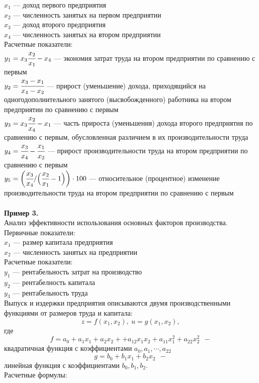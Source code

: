 \documentclass[12pt]{article}
\theoremstyle{definition}
\numberwithin{equation}{section}
\begin{document}
	$x_1$ --- доход первого предприятия\\
	$x_2$ --- численность занятых на первом предприятии\\
	$x_3$ --- доход второго предприятия\\
	$x_4$ --- численность занятых на втором предприятии\\
	Расчетные показатели:\\
	$y_1=x_3\cfrac{x_2}{x_1}-x_4$ --- экономия затрат труда на втором предприятии по сравнению с первым\\
	$y_2=\cfrac{x_3-x_1}{x_4-x_2}$ --- прирост (уменьшение) дохода, приходящийся на одногодополнительного занятого (высвобожденного) работника на втором предприятии по сравнению с первым\\
	$y_3=x_3\cfrac{x_2}{x_4}-x_1$ --- часть прироста (уменьшения) дохода второго предприятия по сравнению с первым, обусловленная различием в их производительности труда\\
	$y_4=\cfrac{x_3}{x_4}-\cfrac{x_1}{x_2}$ --- прирост производительности труда на втором предприятии по сравнению с первым\\
	$y_5=\bigg(\cfrac{x_3}{x_4}/\Big(\cfrac{x_2}{x_1}-1\Big)\bigg)\cdot 100$ --- относительное (процентное) изменение производительности труда на втором предприятии по сравнению с первым\\
	\\
	\textbf{Пример 3.}\\
	Анализ эффективности использования основных факторов производства.\\
	Первичные показатели:\\
	$x_1$ --- размер капитала предприятия\\
	$x_2$ --- численность занятых на предприятии\\
	Расчетные показатели:\\
	$y_1$ --- рентабельность затрат на производство\\
	$y_2$ --- рентабелность капитала\\
	$y_3$ --- рентабельность труда\\
	Выпуск и издержки предприятия описываются двумя производственными функциями от размеров труда и капитала: $$z=f(x_1, x_2),~u=g(x_1, x_2),$$
	где $$f=a_0+a_1x_1+a_2x_2++a_{12}x_1x_2+a_{11}x_1^2+a_{22}x_2^2 ~~- $$
	квадратичная функция с коэффициентами $a_0, a_1, \cdots, a_{22}$
	$$g=b_0+b_1x_1+b_2x_2 ~~- $$
	линейная функция с коэффициентами $b_0, b_1, b_2$.\\
	Расчетные формулы:\\
\end{document}

